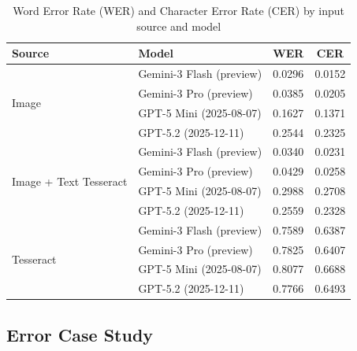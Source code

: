 \begin{table}[htbp]
\centering
\caption{Word Error Rate (WER) and Character Error Rate (CER) by input source and model}
\label{tab:wer_cer_models}
\renewcommand{\arraystretch}{1.2}
\begin{tabular}{llcc}
\toprule
\textbf{Source} & \textbf{Model} & \textbf{WER} & \textbf{CER}  \\
\midrule
\multirow{4}{*}{Image}
 & Gemini-3 Flash (preview) & 0.0296 & 0.0152   \\
 & Gemini-3 Pro (preview)   & 0.0385 & 0.0205   \\
 & GPT-5 Mini (2025-08-07)  & 0.1627 & 0.1371   \\
 & GPT-5.2 (2025-12-11)     & 0.2544 & 0.2325   \\
\midrule
\multirow{4}{*}{Image + Text Tesseract}
 & Gemini-3 Flash (preview) & 0.0340 & 0.0231   \\
 & Gemini-3 Pro (preview)   & 0.0429 & 0.0258   \\
 & GPT-5 Mini (2025-08-07)  & 0.2988 & 0.2708   \\
 & GPT-5.2 (2025-12-11)     & 0.2559 & 0.2328   \\
\midrule
\multirow{4}{*}{Tesseract}
 & Gemini-3 Flash (preview) & 0.7589 & 0.6387   \\
 & Gemini-3 Pro (preview)   & 0.7825 & 0.6407   \\
 & GPT-5 Mini (2025-08-07)  & 0.8077 & 0.6688   \\
 & GPT-5.2 (2025-12-11)     & 0.7766 & 0.6493   \\
\bottomrule
\end{tabular}
\end{table}



\subsection{Error Case Study}


